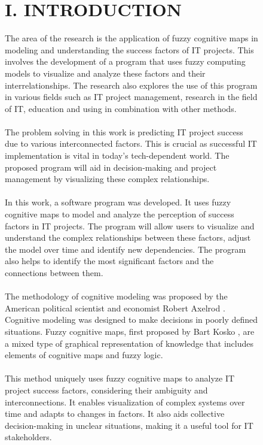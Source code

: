 \documentclass{article}
\begin{document}
\begin{figure}[!t]
\begin{minipage}{0.49\textwidth}
\begin{center}
                \chapter{I. INTRODUCTION}
            \end{center}
            The area of the research is the application of fuzzy cognitive maps in modeling and understanding the success factors of IT projects. This involves the development of a program that uses fuzzy computing models to visualize and analyze these factors and their interrelationships. The research also explores the use of this program in various fields such as IT project management, research in the field of IT, education and using in combination with other methods.\\
            ~\\
            The problem solving in this work is predicting IT project success due to various interconnected factors. This is crucial as successful IT implementation is vital in today's tech-dependent world. The proposed program will aid in decision-making and project management by visualizing these complex relationships.\\
            ~\\
            In this work, a software program was developed. It uses fuzzy cognitive maps to model and analyze the perception of success factors in IT projects. The program will allow users to visualize and understand the complex relationships between these factors, adjust the model over time and identify new dependencies. The program also helps to identify the most significant factors and the connections between them.\\
            ~\\
            The methodology of cognitive modeling was proposed by the American political scientist and economist Robert Axelrod \cite{litlink12}. Cognitive modeling was designed to make decisions in poorly defined situations. Fuzzy cognitive maps, first proposed by Bart Kosko \cite{litlink13}, are a mixed type of graphical representation of knowledge that includes elements of cognitive maps and fuzzy logic.\\
            ~\\
            This method uniquely uses fuzzy cognitive maps to analyze IT project success factors, considering their ambiguity and interconnections. It enables visualization of complex systems over time and adapts to changes in factors. It also aids collective decision-making in unclear situations, making it a useful tool for IT stakeholders.\\

\end{minipage}
\end{figure}
\end{document}

